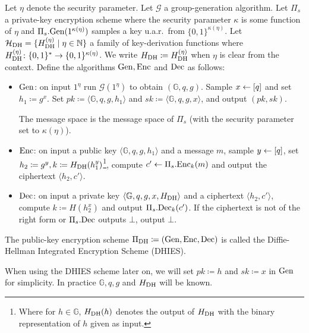 \begin{definition}
	Let $\eta$ denote the security parameter. Let $\mathcal{G}$ a group-generation algorithm. Let $\Pi_s$ a private-key encryption scheme where the security parameter $\kappa$ is some function of $\eta$ and $\Pi_s.\mathrm{Gen}(1^{\kappa(\eta)})$ samples a key u.a.r.\ from $\{0, 1\}^{\kappa(\eta)}$. Let $\mathcal{H}_\mathrm{DH} = \{H_\mathrm{DH}^{(\eta)} \mid \eta \in \mathbb{N} \}$ a family of key-derivation functions where $H_\mathrm{DH}^{(\eta)} \colon \{0, 1\}^* \to \{0, 1\}^{\kappa(\eta)}$. We write $H_\mathrm{DH} \coloneqq H_\mathrm{DH}^{(\eta)}$ when $\eta$ is clear from the context. Define the algorithms $\mathrm{Gen}, \mathrm{Enc}$ and $\mathrm{Dec}$ as follows:
	\begin{itemize}
		\item $\mathrm{Gen}$: on input $1^\eta$ run $\mathcal{G}(1^\eta)$ to obtain $(\mathbb{G}, q, g)$. Sample $x \leftarrow [q]$ and set $h_1 \coloneqq g^x$. Set $pk \coloneqq \langle \mathbb{G}, q, g, h_1 \rangle$ and $sk \coloneqq \langle \mathbb{G}, q, g, x \rangle$, and output $(pk, sk)$.

		      The message space is the message space of $\Pi_s$ (with the security parameter set to $\kappa(\eta)$).
		\item $\mathrm{Enc}$: on input a public key $\langle \mathbb{G}, q, g, h_1 \rangle$ and a message $m$, sample $y \leftarrow [q]$, set $h_2 \coloneqq g^y, k \coloneqq H_\mathrm{DH}(h_1^y)$\footnote{Where for $h \in \mathbb{G}$, $H_\mathrm{DH}(h)$ denotes the output of $H_\mathrm{DH}$ with the binary representation of $h$ given as input.}, compute $c' \leftarrow \Pi_s.\mathrm{Enc}_k(m)$ and output the ciphertext $\langle h_2, c' \rangle$.
		\item $\mathrm{Dec}$: on input a private key $\langle \mathbb{G}, q, g, x, H_\mathrm{DH} \rangle$ and a ciphertext $\langle h_2, c' \rangle$, compute $k \coloneqq H(h_2^x)$ and output $\Pi_s.\mathrm{Dec}_k(c')$. If the ciphertext is not of the right form or $\Pi_s.\mathrm{Dec}$ outputs $\bot$, output $\bot$.
	\end{itemize}
	The public-key encryption scheme $\Pi_{\mathrm{DH}} \coloneqq (\mathrm{Gen}, \mathrm{Enc}, \mathrm{Dec})$ is called the Diffie-Hellman Integrated Encryption Scheme (DHIES).

	When using the DHIES scheme later on, we will set $pk \coloneqq h $ and $sk \coloneqq x$ in $\mathrm{Gen}$ for simplicity. In practice $\mathbb{G}, q, g$ and $H_\mathrm{DH}$ will be known.
\end{definition}

